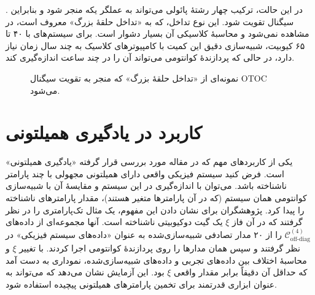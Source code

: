 . در این حالت، ترکیب چهار رشتهٔ پائولی می‌تواند به عملگر یکه منجر شود و بنابراین سیگنال تقویت شود. این نوع تداخل، که به «تداخل حلقهٔ بزرگ» معروف است، در  مشاهده نمی‌شود و محاسبهٔ کلاسیکی آن بسیار دشوار است. برای سیستم‌های با ۴۰ تا ۶۵ کیوبیت، شبیه‌سازی دقیق این کمیت با کامپیوترهای کلاسیک به چند سال زمان نیاز دارد، در حالی که پردازندهٔ کوانتومی می‌تواند آن را در چند ساعت اندازه‌گیری کند.

\begin{figure}[htbp]
  \centering
  \caption{نمونه‌ای از «تداخل حلقهٔ بزرگ» که منجر به تقویت سیگنال OTOC می‌شود. }
  \label{fig:otoc-interference}
\end{figure}

\section{کاربرد در یادگیری همیلتونی}

یکی از کاربردهای مهم  که در مقاله مورد بررسی قرار گرفته «یادگیری همیلتونی» است. فرض کنید سیستم فیزیکی واقعی دارای همیلتونی مجهولی با چند پارامتر ناشناخته باشد. می‌توان با اندازه‌گیری  در این سیستم و مقایسهٔ آن با شبیه‌سازی کوانتومی همان سیستم (که در آن پارامترها متغیر هستند)، مقدار پارامترهای ناشناخته را پیدا کرد. پژوهشگران برای نشان دادن این مفهوم، یک مثال تک‌پارامتری را در نظر گرفتند که در آن فاز \(\xi\) یک گیت دوکیوبیتی ناشناخته است. آنها مجموعه‌ای از داده‌های \(\mathcal{C}_{\text{off-diag}}^{(4)}\) را از ۲۰ مدار تصادفی شبیه‌سازی‌شده به عنوان «داده‌های سیستم فیزیکی» در نظر گرفتند و سپس همان مدارها را روی پردازندهٔ کوانتومی اجرا کردند. با تغییر \(\xi\) و محاسبهٔ اختلاف بین داده‌های تجربی و داده‌های شبیه‌سازی‌شده، نموداری به دست آمد که حداقل آن دقیقاً برابر مقدار واقعی \(\xi\) بود. این آزمایش نشان می‌دهد که  می‌تواند به عنوان ابزاری قدرتمند برای تخمین پارامترهای همیلتونی پیچیده استفاده شود.

